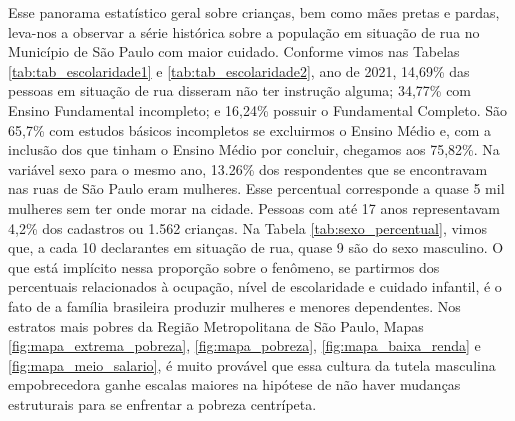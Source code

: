 \documentclass[14pt]{extarticle}
\begin{document}
Esse panorama estatístico geral sobre crianças, bem como mães pretas e pardas, leva-nos a observar a série histórica sobre a população em situação de rua no Município de São Paulo com maior cuidado. Conforme vimos nas Tabelas \ref{tab:tab_escolaridade1} e \ref{tab:tab_escolaridade2}, ano de 2021, 14,69\% das pessoas em situação de rua disseram não ter instrução alguma; 34,77\% com Ensino Fundamental incompleto; e 16,24\% possuir o Fundamental Completo. São 65,7\% com estudos básicos incompletos se excluirmos o Ensino Médio e, com a inclusão dos que tinham o Ensino Médio por concluir, chegamos aos 75,82\%. Na variável sexo para o mesmo ano, 13.26\% dos respondentes que se encontravam nas ruas de São Paulo eram mulheres. Esse percentual corresponde a quase 5 mil mulheres sem ter onde morar na cidade. Pessoas com até 17 anos representavam 4,2\% dos cadastros ou 1.562 crianças. Na Tabela \ref{tab:sexo_percentual}, vimos que, a cada 10 declarantes em situação de rua, quase 9 são do sexo masculino. O que está implícito nessa proporção sobre o fenômeno, se partirmos dos percentuais relacionados à ocupação, nível de escolaridade e cuidado infantil, é o fato de a família brasileira produzir mulheres e menores dependentes. Nos estratos mais pobres da Região Metropolitana de São Paulo, Mapas \ref{fig:mapa_extrema_pobreza}, \ref{fig:mapa_pobreza}, \ref{fig:mapa_baixa_renda} e \ref{fig:mapa_meio_salario}, é muito provável que essa cultura da tutela masculina empobrecedora ganhe escalas maiores na hipótese de não haver mudanças estruturais para se enfrentar a pobreza centrípeta.\\
\end{document}
